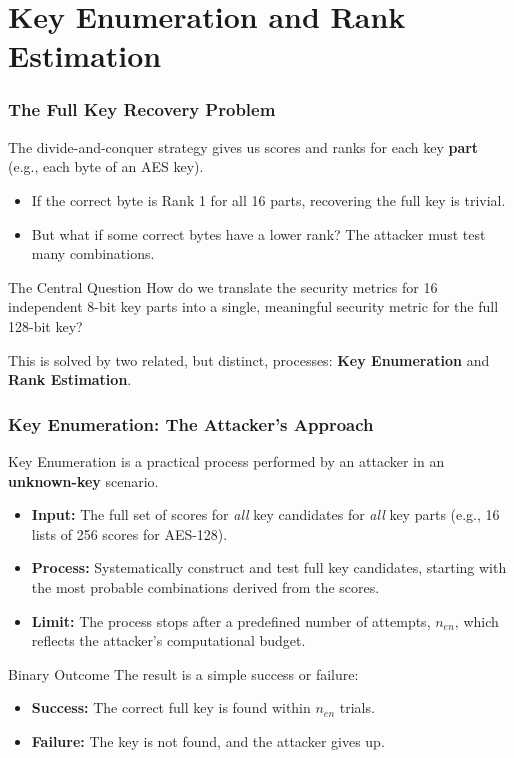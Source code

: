 \section{Key Enumeration and Rank Estimation}

\begin{frame}
    \frametitle{The Full Key Recovery Problem}

    The divide-and-conquer strategy gives us scores and ranks for each key \textbf{part} (e.g., each byte of an AES key).

    \begin{itemize}
        \item If the correct byte is Rank 1 for all 16 parts, recovering the full key is trivial.
        \item But what if some correct bytes have a lower rank? The attacker must test many combinations.
    \end{itemize}

    \begin{block}{The Central Question}
        How do we translate the security metrics for 16 independent 8-bit key parts into a single, meaningful security metric for the full 128-bit key?
    \end{block}

    This is solved by two related, but distinct, processes: \textbf{Key Enumeration} and \textbf{Rank Estimation}.
\end{frame}


\begin{frame}
    \frametitle{Key Enumeration: The Attacker's Approach}

    Key Enumeration is a practical process performed by an attacker in an \textbf{unknown-key} scenario.
    
    \begin{itemize}
        \item \textbf{Input:} The full set of scores for \textit{all} key candidates for \textit{all} key parts (e.g., 16 lists of 256 scores for AES-128).
        \item \textbf{Process:} Systematically construct and test full key candidates, starting with the most probable combinations derived from the scores.
        \item \textbf{Limit:} The process stops after a predefined number of attempts, $n_{en}$, which reflects the attacker's computational budget.
    \end{itemize}
    
    \begin{alertblock}{Binary Outcome}
        The result is a simple success or failure:
        \begin{itemize}
            \item \textbf{Success:} The correct full key is found within $n_{en}$ trials.
            \item \textbf{Failure:} The key is not found, and the attacker gives up.
        \end{itemize}
    \end{alertblock}
\end{frame}

